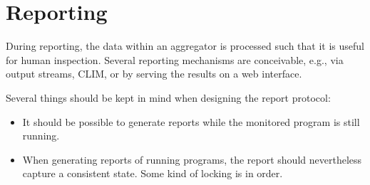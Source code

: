 \section{Reporting}
\label{sec:reporting}

During reporting, the data within an aggregator is processed such that it
is useful for human inspection.  Several reporting mechanisms are
conceivable, e.g., via output streams, CLIM, or by serving the results on a
web interface.

Several things should be kept in mind when designing the report protocol:
\begin{itemize}
\item It should be possible to generate reports while the monitored program
  is still running.
\item When generating reports of running programs, the report should
  nevertheless capture a consistent state.  Some kind of locking is in order.
\end{itemize}
